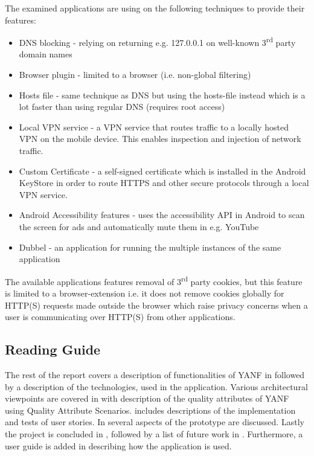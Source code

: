 \documentclass[main.tex]{subfiles}
\begin{document}
The examined applications are using on the following techniques to provide their features:
\begin{itemize}
    \item DNS blocking - relying on returning e.g. 127.0.0.1 on well-known 3\textsuperscript{rd} party domain names
    \item Browser plugin - limited to a browser (i.e. non-global filtering)
    \item Hosts file - same technique as DNS but using the hosts-file instead which is a lot faster than using regular DNS (requires root access)
    \item Local VPN service - a VPN service that routes traffic to a locally hosted VPN on the mobile device. This enables inspection and injection of network traffic.
    \item Custom Certificate - a self-signed certificate which is installed in the Android KeyStore in order to route HTTPS and other secure protocols through a local VPN service.
    \item Android Accessibility features - uses the accessibility API in Android to scan the screen for ads and automatically mute them in e.g. YouTube
    \item Dubbel - an application for running the multiple instances of the same application
\end{itemize}
The available applications features removal of 3\textsuperscript{rd} party cookies, but this feature is limited to a browser-extension i.e. it does not remove cookies globally for HTTP(S) requests made outside the browser which raise privacy concerns when a user is communicating over HTTP(S) from other applications. 



\subsection{Reading Guide}
The rest of the report covers a description of functionalities of YANF in  followed by a description of the technologies,  used in the application. Various architectural viewpoints are covered in  with description of the quality attributes of YANF using Quality Attribute Scenarios.  includes descriptions of the implementation and tests of user stories. In  several aspects of the prototype are discussed.
Lastly the project is concluded in , followed by a list of future work in . Furthermore, a user guide is added in  describing how the application is used. 
\end{document}
